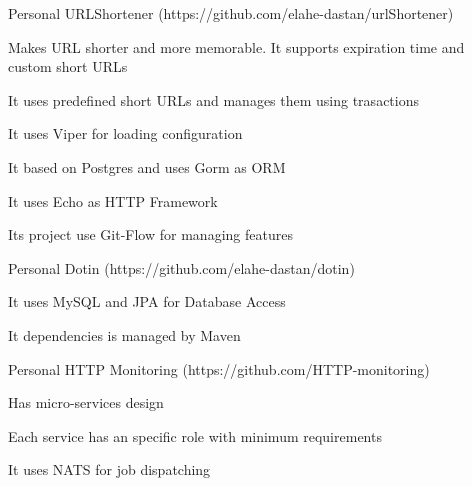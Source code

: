 

\begin{cventries}

    \cventry
    {Personal} %
    {URLShortener ({\tiny https://github.com/elahe-dastan/urlShortener})} %
    {} %
    {} %
    {
      \begin{cvitems} %
        \item{Makes URL shorter and more memorable. It supports expiration time and custom short URLs}
        \item{It uses predefined short URLs and manages them using trasactions}
        \item{It uses Viper for loading configuration}
        \item{It based on Postgres and uses Gorm as ORM}
        \item{It uses Echo as HTTP Framework}
        \item{Its project use Git-Flow for managing features}
      \end{cvitems}
    }

    \cventry
    {Personal}
    {Dotin ({\tiny https://github.com/elahe-dastan/dotin})}
    {}
    {}
    {
        \begin{cvitems} %
            \item It uses MySQL and JPA for Database Access
            \item It dependencies is managed by Maven
        \end{cvitems}
    }
    
    \cventry
    {Personal} %
    {HTTP Monitoring ({\tiny https://github.com/HTTP-monitoring})} %
    {} %
    {} %
    {
      \begin{cvitems} %
        \item{Has micro-services design}
        \item{Each service has an specific role with minimum requirements}
        \item{It uses NATS for job dispatching}
      \end{cvitems}
    }
    

\end{cventries}
